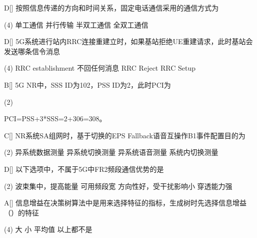 \begin{choice}{D}[]
    按照信息传递的方向和时间关系，固定电话通信采用的通信方式为
    \begin{tasks}(4)
        \task 单工通信
        \task 并行传输
        \task 半双工通信
        \task 全双工通信
    \end{tasks}
\end{choice}

\begin{choice}{D}[]
    5G系统进行站内RRC连接重建立时，如果基站拒绝UE重建请求，此时基站会发送哪条信令消息
    \begin{tasks}(4)
        \task RRC establishment
        \task 不回任何消息
        \task RRC Reject
        \task RRC Setup
    \end{tasks}
\end{choice}


\begin{choice}{B}[]
    5G NR中，SSS ID为102，PSS ID为2，此时PCI为
    \begin{tasks}(2)
    \end{tasks}
\end{choice}

\begin{solution}
    PCI=PSS+3*SSS=2+306=308。
\end{solution}

\begin{choice}{C}[]
    NR系统SA组网时，基于切换的EPS Fallback语音互操作B1事件配置目的为
    \begin{tasks}(2)
        \task 异系统数据测量
        \task 异系统切换测量
        \task 异系统语音测量
        \task 系统内切换测量
    \end{tasks}
\end{choice}



\begin{choice}{D}[]
    以下选项中，不属于5G中FR2频段通信优势的是
    \begin{tasks}(2)
        \task 波束集中，提高能量
        \task 可用频段宽
        \task 方向性好，受干扰影响小
        \task 穿透能力强
    \end{tasks}
\end{choice}




\begin{choice}{A}[]
    信息增益在决策树算法中是用来选择特征的指标，生成树时先选择信息增益（\qquad）的特征
    \begin{tasks}(4)
        \task 大
        \task 小
        \task 平均值
        \task 以上都不是
    \end{tasks}
\end{choice}

